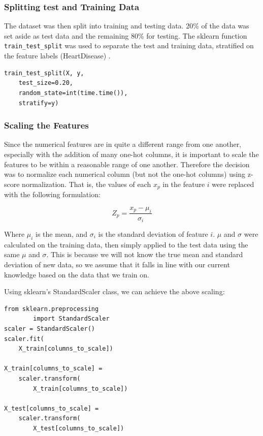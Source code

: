 \documentclass[12pt,conference]{IEEEtran}
\begin{document}
\subsubsection{Splitting test and Training Data}
The dataset was then split into training and testing data. 20\% of the data was set aside as test data and the remaining 80\% for testing. The sklearn function \verb| train_test_split| was used to separate the test and training data, stratified on the feature labels (HeartDisease) \cite{sklearn}. 

\vspace{0.3cm}
\begin{Verbatim}[framesep=3mm]
train_test_split(X, y, 
    test_size=0.20, 
    random_state=int(time.time()), 
    stratify=y)
\end{Verbatim} 
\vspace{0.5cm}

\subsubsection{Scaling the Features}
Since the numerical features are in quite a different range from one another, especially with the addition of many one-hot columns, it is important to scale the features to be within a reasonable range of one another. Therefore the decision was to normalize each numerical column (but not the one-hot columns) using z-score normalization. That is, the values of each $x_p$ in the feature $i$ were replaced with the following formulation:

$$ Z_p = \frac{x_p - \mu_i}{\sigma_i} $$

Where $\mu_i$ is the mean, and $\sigma_i$ is the standard deviation of feature $i$. $\mu$ and $\sigma$ were calculated on the training data, then simply applied to the test data using the same $\mu$ and $\sigma$. This is because we will not know the true mean and standard deviation of new data, so we assume that it falls in line with our current knowledge based on the data that we train on.

Using sklearn's StandardScaler class, we can achieve the above scaling:

\vspace{0.3cm}
\begin{minipage}{0.89\linewidth}
\begin{Verbatim}[framesep=3mm]
from sklearn.preprocessing 
        import StandardScaler
scaler = StandardScaler()
scaler.fit(
    X_train[columns_to_scale])

X_train[columns_to_scale] = 
    scaler.transform(
        X_train[columns_to_scale])
        
X_test[columns_to_scale] = 
    scaler.transform(
        X_test[columns_to_scale])
\end{Verbatim}
\end{minipage}
\vspace{0.5cm}
\end{document}

